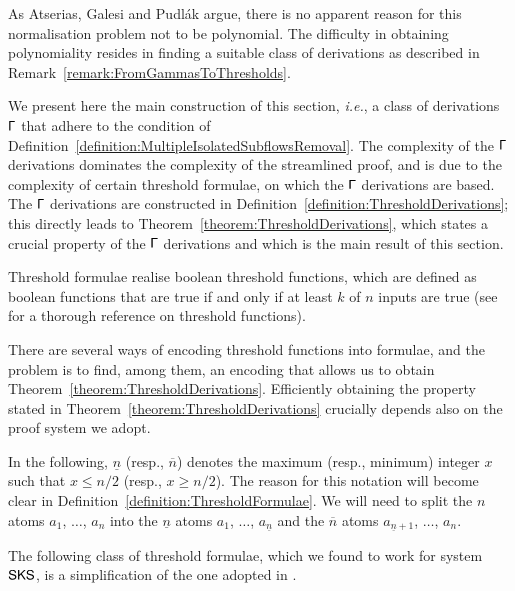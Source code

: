 As Atserias, Galesi and Pudl\'ak argue, there is no apparent reason for this normalisation problem not to be polynomial. The difficulty in obtaining polynomiality resides in finding a suitable class of derivations as described in Remark~\vref{remark:FromGammasToThresholds}.

We present here the main construction of this section, \emph{i.e.}, a class of derivations $\mathsf\Gamma$ that adhere to the condition of Definition~\vref{definition:MultipleIsolatedSubflowsRemoval}. The complexity of the $\mathsf\Gamma$ derivations dominates the complexity of the streamlined proof, and is due to the complexity of certain threshold formulae, on which the $\mathsf\Gamma$ derivations are based. The $\mathsf\Gamma$ derivations are constructed in Definition~\vref{definition:ThresholdDerivations}; this directly leads to Theorem~\vref{theorem:ThresholdDerivations}, which states a crucial property of the $\mathsf\Gamma$ derivations and which is the main result of this section.

Threshold formulae realise boolean threshold functions, which are defined as boolean functions that are true if and only if at least $k$ of $n$ inputs are true (see \cite{Wege:87:The-Comp:vn} for a thorough reference on threshold functions).

There are several ways of encoding threshold functions into formulae, and the problem is to find, among them, an encoding that allows us to obtain Theorem~\vref{theorem:ThresholdDerivations}. Efficiently obtaining the property stated in Theorem~\ref{theorem:ThresholdDerivations} crucially depends also on the proof system we adopt.


In the following, $\underline  n$ (resp., $\overline  n$) denotes the maximum (resp., minimum) integer $x$ such that $x\le n/2$ (resp., $x\ge n/2$). The reason for this notation will become clear in Definition~\vref{definition:ThresholdFormulae}. We will need to split the $n$ atoms $a_1$, $\dots$, $a_n$ into the $\underline  n$ atoms $a_1$, $\dots$, $a_{\underline  n}$ and the $\overline  n$ atoms $a_{\underline  n+1}$, $\dots$, $a_n$.

The following class of threshold formulae, which we found to work for system $\mathsf{SKS}$, is a simplification of the one adopted in \cite{AtseGalePudl:02:Monotone:yu}.

\newcommand{\avec}[2]{(a_{#1},\dots,a_{#2})}

